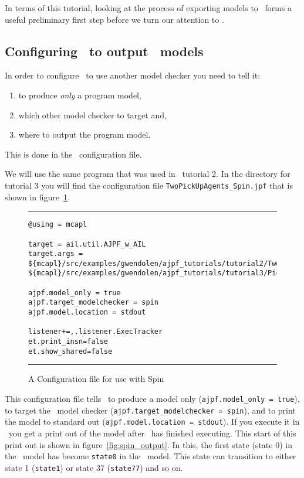 In terms of this tutorial, looking at the process of exporting models to \spin\ forms a useful preliminary first step before we turn our attention to \prism.

\subsection{Configuring \ajpf\ to output \spin\ models}
\label{sec:configure_spin}

In order to configure \ajpf\ to use another model checker you need to tell it:
\begin{enumerate}
\item to produce \emph{only} a program model, 
\item which other model checker to target and, 
\item where to output the program model.
\end{enumerate}  This is done in the \ajpf\ configuration file.  

We will use the same program that was used in \ajpf\ tutorial 2.  In the directory for tutorial 3 you will find the configuration file \texttt{TwoPickUpAgents\_Spin.jpf} that is shown in figure~\ref{fig:spin_config}.

\begin{figure}[htb]
\noindent\rule{\textwidth}{1pt}
\begin{small}
\begin{verbatim}
@using = mcapl

target = ail.util.AJPF_w_AIL
target.args = ${mcapl}/src/examples/gwendolen/ajpf_tutorials/tutorial2/TwoPickUpAgents.ail,
${mcapl}/src/examples/gwendolen/ajpf_tutorials/tutorial3/PickUpAgent.psl,1

ajpf.model_only = true
ajpf.target_modelchecker = spin
ajpf.model.location = stdout

listener+=,.listener.ExecTracker
et.print_insn=false
et.show_shared=false
\end{verbatim}
\end{small}
\rule{\textwidth}{1pt}
\caption{A Configuration file for use with Spin}
\label{fig:spin_config}
\end{figure}

This configuration file tells \ajpf\ to produce a model only (\texttt{ajpf.model\_only = true}), to target the \spin\ model checker (\texttt{ajpf.target\_modelchecker = spin}), and to print the model to standard out (\texttt{ajpf.model.location = stdout}).  If you execute it in \ajpf\ you get a print out of the model after \ajpf\  has finished executing.  This start of this print out is shown in figure~\ref{fig:spin_output}.
In this, the first state (state 0) in the \ajpf\ model has become \texttt{state0} in the \promela\ model.  This state can transition to either state 1 (\texttt{state1}) or state 37 (\texttt{state77}) and so on.

